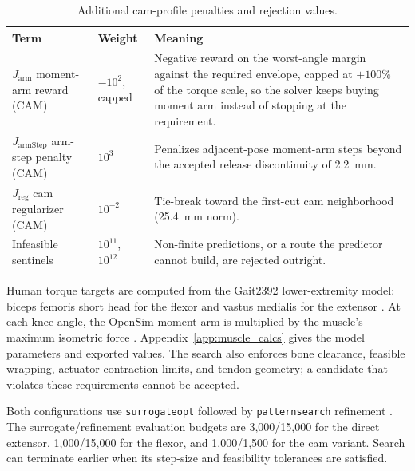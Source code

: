 \begin{table}[htbp]
\caption{Additional cam-profile penalties and rejection values.}\label{tab:mesh_cam_penalties}
\small\singlespacing
\begin{tabularx}{\textwidth}{@{}p{}p{}X@{}}
\toprule
\textbf{Term} & \textbf{Weight} & \textbf{Meaning} \\
\midrule
$J_{\text{arm}}$ moment-arm reward (CAM) & $-10^{2}$, capped & Negative reward on the worst-angle margin against the required envelope, capped at $+100\%$ of the torque scale, so the solver keeps buying moment arm instead of stopping at the requirement. \\
$J_{\text{armStep}}$ arm-step penalty (CAM) & $10^{3}$ & Penalizes adjacent-pose moment-arm steps beyond the accepted release discontinuity of \qty{2.2}{\mm}. \\
$J_{\text{reg}}$ cam regularizer (CAM) & $10^{-2}$ & Tie-break toward the first-cut cam neighborhood (\qty{25.4}{\mm} norm). \\
Infeasible sentinels & $10^{11}$, $10^{12}$ & Non-finite predictions, or a route the predictor cannot build, are rejected outright. \\
\bottomrule
\end{tabularx}
\end{table}

Human torque targets are computed from the Gait2392 lower-extremity model: biceps femoris short head for the flexor and vastus medialis for the extensor \citep{delp_opensim_2007,seth_opensim_2018}. At each knee angle, the OpenSim moment arm is multiplied by the muscle's maximum isometric force \citep{delp_interactive_1990,hoy_musculoskeletal_1990,sherman_what_2013}. Appendix~\ref{app:muscle_calcs} gives the model parameters and exported values. The search also enforces bone clearance, feasible wrapping, actuator contraction limits, and tendon geometry; a candidate that violates these requirements cannot be accepted.

Both configurations use \texttt{surrogateopt} followed by \texttt{patternsearch} refinement \citep{mathworks_optimization_2025,audet_mads_2006}. The surrogate/refinement evaluation budgets are 3,000/15,000 for the direct extensor, 1,000/15,000 for the flexor, and 1,000/1,500 for the cam variant. Search can terminate earlier when its step-size and feasibility tolerances are satisfied.

